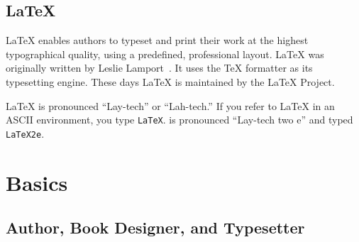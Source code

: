 \subsection{\LaTeX}

\LaTeX{} enables authors to typeset and print their work at the highest
typographical quality, using a predefined, professional layout. \LaTeX{} was
originally written by Leslie Lamport~\cite{manual}.
It uses the \TeX{} formatter as its typesetting engine. These days \LaTeX{}
is maintained by the \LaTeX{} Project.


\LaTeX{} is pronounced ``Lay-tech'' or ``Lah-tech.'' If you refer to
\LaTeX{} in an ASCII environment, you type \texttt{LaTeX}.
\LaTeXe{} is pronounced ``Lay-tech two e'' and typed \texttt{LaTeX2e}.


%

\section{Basics}

\subsection{Author, Book Designer, and Typesetter}

